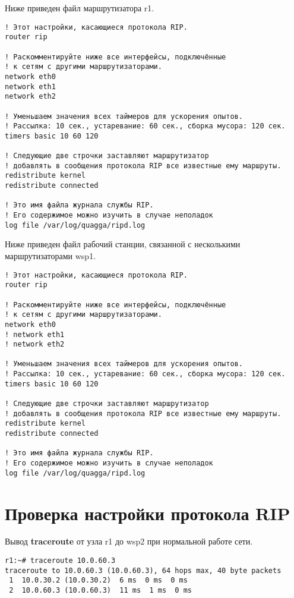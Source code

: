 \documentclass[a4paper,12pt]{article}
\begin{document}
Ниже приведен файл  маршрутизатора r1.

\begin{Verbatim}
! Этот настройки, касающиеся протокола RIP.
router rip

! Раскомментируйте ниже все интерфейсы, подключённые
! к сетям с другими маршрутизаторами.
network eth0
network eth1
network eth2

! Уменьшаем значения всех таймеров для ускорения опытов.
! Рассылка: 10 сек., устаревание: 60 cек., сборка мусора: 120 сек.
timers basic 10 60 120

! Следующие две строчки заставляют маршрутизатор
! добавлять в сообщения протокола RIP все известные ему маршруты.
redistribute kernel
redistribute connected

! Это имя файла журнала службы RIP.
! Его содержимое можно изучить в случае неполадок
log file /var/log/quagga/ripd.log
\end{Verbatim}


Ниже приведен файл  рабочий станции, связанной с несколькими маршрутизаторами wsp1.

\begin{Verbatim}
! Этот настройки, касающиеся протокола RIP.
router rip

! Раскомментируйте ниже все интерфейсы, подключённые
! к сетям с другими маршрутизаторами.
network eth0
! network eth1
! network eth2

! Уменьшаем значения всех таймеров для ускорения опытов.
! Рассылка: 10 сек., устаревание: 60 cек., сборка мусора: 120 сек.
timers basic 10 60 120

! Следующие две строчки заставляют маршрутизатор
! добавлять в сообщения протокола RIP все известные ему маршруты.
redistribute kernel
redistribute connected

! Это имя файла журнала службы RIP.
! Его содержимое можно изучить в случае неполадок
log file /var/log/quagga/ripd.log
\end{Verbatim}


\section{Проверка настройки протокола RIP}

Вывод \textbf{traceroute} от узла r1 до wsp2 при нормальной работе сети.

\begin{Verbatim}
r1:~# traceroute 10.0.60.3
traceroute to 10.0.60.3 (10.0.60.3), 64 hops max, 40 byte packets
 1  10.0.30.2 (10.0.30.2)  6 ms  0 ms  0 ms
 2  10.0.60.3 (10.0.60.3)  11 ms  1 ms  0 ms
\end{Verbatim}
\end{document}
